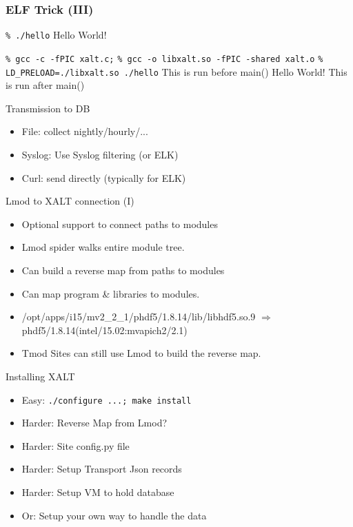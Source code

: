 \documentclass{beamer}
\begin{document}
\begin{frame}[fragile]
    \frametitle{ELF Trick (III)}
 {\small
    \begin{semiverbatim}
{\color{red}\texttt{\% ./hello}}
Hello World!

{\color{red}\texttt{\% gcc -c -fPIC xalt.c;}}
{\color{red}\texttt{\% gcc -o libxalt.so -fPIC -shared xalt.o}}
{\color{red}\texttt{\% LD\_PRELOAD=./libxalt.so ./hello}}
This is run before main()
Hello World!
This is run after main()
    \end{semiverbatim}
}
\end{frame}

\begin{frame}{Transmission to DB}
  \begin{itemize}
    \item File: collect nightly/hourly/...
    \item Syslog: Use Syslog filtering (or ELK)
    \item Curl: send directly (typically for ELK)
  \end{itemize}
\end{frame}

\begin{frame}{Lmod to XALT connection (I)}
  \begin{itemize}
    \item Optional support to connect paths to modules
    \item Lmod spider walks entire module tree.
    \item Can build a reverse map from paths to modules
    \item Can map program \& libraries to modules.
    \item /opt/apps/i15/mv2\_2\_1/phdf5/1.8.14/lib/libhdf5.so.9
      $\Rightarrow$ phdf5/1.8.14(intel/15.02:mvapich2/2.1)
    \item Tmod Sites can still use Lmod to build the reverse map.
  \end{itemize}
\end{frame}

\begin{frame}{Installing XALT}
  \begin{itemize}
    \item Easy: \texttt{./configure ...; make install}
    \item Harder: Reverse Map from Lmod?
    \item Harder: Site config.py file
    \item Harder: Setup Transport Json records
    \item Harder: Setup VM to hold database
    \item Or: Setup your own way to handle the data
  \end{itemize}
\end{frame}
\end{document}
